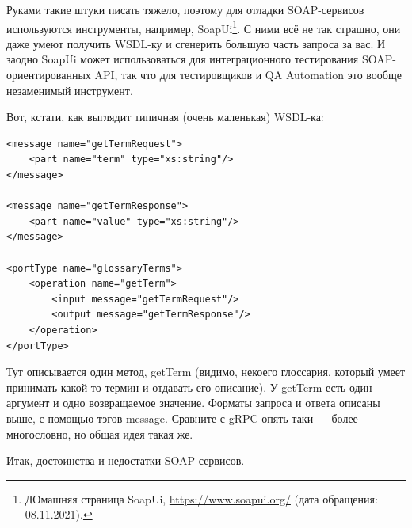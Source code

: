 \documentclass[a5paper]{article}
\begin{document}
Руками такие штуки писать тяжело, поэтому для отладки SOAP-сервисов используются инструменты, например, SoapUi\footnote{ДОмашняя страница SoapUi, \url{https://www.soapui.org/} (дата обращения: 08.11.2021).}. С ними всё не так страшно, они даже умеют получить WSDL-ку и сгенерить большую часть запроса за вас. И заодно SoapUi может использоваться для интеграционного тестирования SOAP-ориентированных API, так что для тестировщиков и QA Automation это вообще незаменимый инструмент.

Вот, кстати, как выглядит типичная (очень маленькая) WSDL-ка:

\begin{verbatim}
<message name="getTermRequest">
    <part name="term" type="xs:string"/>
</message>

<message name="getTermResponse">
    <part name="value" type="xs:string"/>
</message>

<portType name="glossaryTerms">
    <operation name="getTerm">
        <input message="getTermRequest"/>
        <output message="getTermResponse"/>
    </operation>
</portType>
\end{verbatim}

Тут описывается один метод, getTerm (видимо, некоего глоссария, который умеет принимать какой-то термин и отдавать его описание). У getTerm есть один аргумент и одно возвращаемое значение. Форматы запроса и ответа описаны выше, с помощью тэгов message. Сравните с gRPC опять-таки --- более многословно, но общая идея такая же.

Итак, достоинства и недостатки SOAP-сервисов.
\end{document}
